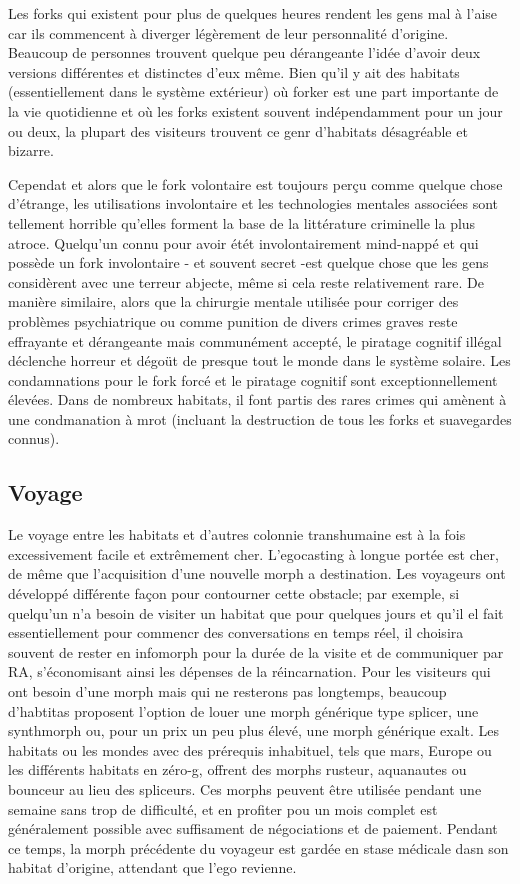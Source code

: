 Les forks qui existent pour plus de quelques heures rendent les gens mal à l'aise car ils commencent à diverger légèrement de leur personnalité d'origine. Beaucoup de personnes trouvent quelque peu dérangeante l'idée d'avoir deux versions différentes et distinctes d'eux même. Bien qu'il y ait des habitats (essentiellement dans le système extérieur) où forker est une part importante de la vie quotidienne et où les forks existent souvent indépendamment pour un jour ou deux, la plupart des visiteurs trouvent ce genr d'habitats désagréable et bizarre. 

Cependat et alors que le fork volontaire est toujours perçu comme quelque chose d'étrange, les utilisations involontaire et les technologies mentales associées sont tellement horrible qu'elles forment la base de la littérature criminelle la plus atroce. Quelqu'un connu pour avoir étét involontairement mind-nappé et qui possède un fork involontaire - et souvent secret -est quelque chose que les gens considèrent avec une terreur abjecte, même si cela reste relativement rare. De manière similaire, alors que la chirurgie mentale utilisée pour corriger des problèmes psychiatrique ou comme punition de divers crimes graves reste effrayante et dérangeante mais communément accepté, le piratage cognitif illégal déclenche horreur et dégoüt de presque tout le monde dans le système solaire. Les condamnations pour le fork forcé et le piratage cognitif sont exceptionnellement élevées. Dans de nombreux habitats, il font partis des rares crimes qui amènent à une condmanation à mrot (incluant la destruction de tous les forks et suavegardes connus). 

\subsection{Voyage} \label{sec:travel} 

Le voyage entre les habitats et d'autres colonnie transhumaine est à la fois excessivement facile et extrêmement cher. L'egocasting à longue portée est cher, de même que l'acquisition d'une nouvelle morph a destination. Les voyageurs ont développé différente façon pour contourner cette obstacle; par exemple, si quelqu'un n'a besoin de visiter un habitat que pour quelques jours et qu'il el fait essentiellement pour commencr des conversations en temps réel, il choisira souvent de rester en infomorph pour la durée de la visite et de communiquer par RA, s'économisant ainsi les dépenses de la réincarnation. Pour les visiteurs qui ont besoin d'une morph mais qui ne resterons pas longtemps, beaucoup d'habtitas proposent l'option de louer une morph générique type splicer, une synthmorph ou, pour un prix un peu plus élevé, une morph générique exalt. Les habitats ou les mondes avec des prérequis inhabituel, tels que mars, Europe ou les différents habitats en zéro-g, offrent des morphs rusteur, aquanautes ou bounceur au lieu des spliceurs. Ces morphs peuvent être utilisée pendant une semaine sans trop de difficulté, et en profiter pou un mois complet est généralement possible avec suffisament de négociations et de paiement. Pendant ce temps, la morph précédente du voyageur est gardée en stase médicale dasn son habitat d'origine, attendant que l'ego revienne. 

